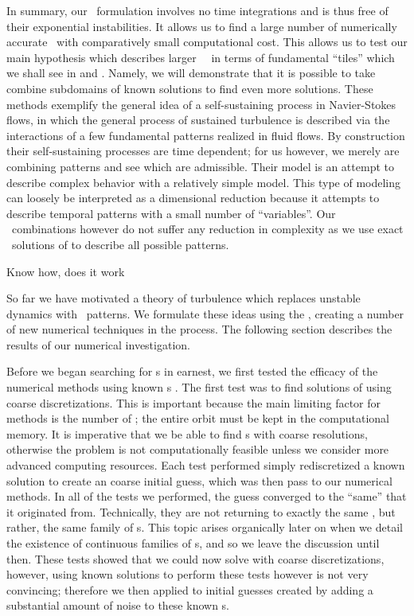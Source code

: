 In summary, our \spt\ formulation involves no time integrations and is
thus free of their exponential instabilities. It allows us to
find a large number of numerically accurate \twots\
with comparatively small computational cost.
This allows
us to test our main hypothesis which describes larger \spt\ \twots\
in terms of fundamental ``tiles'' which we shall see in 
and \refsect{sect:glue}. Namely, we will demonstrate that it is possible to
take combine subdomains of known solutions to find even more solutions.
These methods exemplify the general idea of a self-sustaining process
in Navier-Stokes flows, in which the general process of sustained
turbulence is described via the interactions of a few fundamental
patterns realized in fluid flows\rf{W97}. By construction their
self-sustaining processes are time dependent; for us however, we
merely are combining patterns and see which are admissible.
Their model is an attempt to describe complex behavior with a
relatively simple model.
This type of modeling can loosely
be interpreted as a dimensional reduction because it attempts
to describe temporal patterns with a small number of ``variables''.
Our \spt\ combinations however do not suffer any reduction in complexity
as we use exact \spt\ solutions of \refeq{e-ks} to describe
all possible patterns.

Know how, does it work

So far we have motivated a {\spt} theory of turbulence
which replaces unstable dynamics with \spt\ patterns.
We formulate these ideas using the \KSe, creating a number of
new numerical techniques in the process.
The following section describes the results of our numerical investigation.

Before we began searching for {\po}s in earnest, we first
tested the efficacy of the {\spt} numerical methods %
using known {\po}s \rf{SCD07}.
The first test was to find solutions of \refeq{e-Fks} using coarse {\spt} discretizations.
This is important because the main limiting factor
for {\spt} methods is the number of {\cdofs}; the entire orbit must be
kept in the computational memory. It is imperative that we be able to
find {\po}s with coarse resolutions, otherwise the problem is not computationally
feasible unless we consider more advanced computing resources.
Each test performed simply rediscretized a known solution to create an coarse
initial guess, which was then pass to our numerical methods.
In all of the tests we performed, the guess converged to the
``same'' {\po} that it originated from.
Technically, they are not returning
to exactly the same {\po}, but rather, the same family of {\po}s. This
topic arises organically later on when we detail the existence
of continuous families of {\fpo}s, and so we leave the discussion until then.
These tests showed that we could now solve \refeq{e-Fks} with coarse
discretizations, however, using known solutions to perform these tests however
is not very convincing; therefore we then applied
to initial guesses created by adding a substantial amount of noise
to these known {\po}s.

